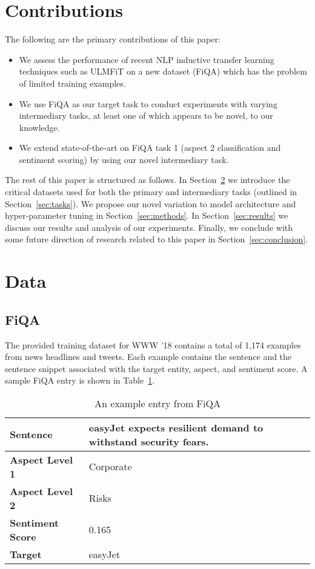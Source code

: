 \documentclass[11pt,a4paper]{article}
\begin{document}
\section{Contributions}

The following are the primary contributions of this paper:

\begin{itemize}
  \item We assess the performance of recent NLP inductive transfer learning techniques such as ULMFiT on a new dataset (FiQA) which has the problem of limited training examples.
  \item We use FiQA as our target task to conduct experiments with varying intermediary tasks, at least one of which appears to be novel, to our knowledge.
  \item We extend state-of-the-art on FiQA task 1 (aspect 2 classification and sentiment scoring) by using our novel intermediary task.
\end{itemize}

The rest of this paper is structured as follows. In Section~\ref{sec:data} we introduce the critical datasets used for both the primary and intermediary tasks (outlined in Section~\ref{sec:tasks}). We propose our novel variation to model architecture and hyper-parameter tuning in Section~\ref{sec:methods}. In Section~\ref{sec:results} we discuss our results and analysis of our experiments. Finally, we conclude with some future direction of research related to this paper in Section~\ref{sec:conclusion}.

\section{Data}
\label{sec:data}

\subsection{FiQA}
The provided training dataset for WWW '18 \cite{maia201818} contains a total of 1,174 examples from news headlines and tweets. Each example contains the sentence and the sentence snippet associated with the target entity, aspect, and sentiment score. A sample FiQA entry is shown in Table~\ref{fiqa-ex}.

\begin{table}
\begin{center}
\begin{tabular}{|p{3cm}|p{3cm}|}
\hline
\bf Sentence & easyJet expects resilient demand to withstand security fears. \\
\hline
\bf Aspect Level 1 & Corporate \\
\hline
\bf Aspect Level 2 & Risks \\
\hline
\bf Sentiment Score & 0.165 \\
\hline
\bf Target & easyJet \\
\hline
\end{tabular}
\end{center}
\label{fiqa-ex}
\caption{ An example entry from FiQA }
\end{table}
\end{document}
